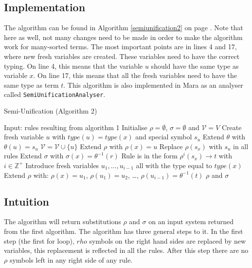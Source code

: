 \subsection{Implementation}
The algorithm can be found in Algorithm \ref{semiunification2} on page \pageref{semiunification2}. Note that here as well, not many changes need to be made in order to make the algorithm work for many-sorted terms. The most important points are in lines 4 and 17, where new fresh variables are created. These variables need to have the correct typing. On line 4, this means that the variable $u$ should have the same type as variable $x$. On line 17, this means that all the fresh variables need to have the same type as term $t$. This algorithm is also implemented in Mara as an analyser called \texttt{SemiUnificationAnalyser}.

\begin{algorithm}
\caption{Semi-Unification (Algorithm 2)}
\label{semiunification2}
\begin{algorithmic}[1]
\STATE Input: rules resulting from algorithm 1
\STATE Initialise $\rho = \emptyset$, $\sigma = \emptyset$ and $\mathcal{V} = V$
  \STATE Create fresh variable $u$ with $\textit{type}(u) = \textit{type}(x)$ and special symbol $s_u$
  \STATE Extend $\theta$ with $\theta(u) = s_u$
  \STATE $\mathcal{V} = \mathcal{V} \cup \{ u \}$
  \STATE Extend $\rho$ with $\rho(x) = u$
  \STATE Replace $\rho(s_x)$ with $s_u$ in all rules
\ENDFOR
{}
    \STATE Extend $\sigma$ with $\sigma(x) = \theta^{-1}(r)$
  \ENDIF
\ENDFOR
{}
  \STATE Rule is in the form $\rho^i(s_x) \rightarrow t$ with $i \in \mathbb{Z}^+$
  \STATE Introduce fresh variables $u_1, \dots, u_{i-1}$ all with the type equal to $\textit{type}(x)$
  \STATE Extend $\rho$ with: $\rho(x) = u_1$, $\rho(u_1) = u_2$, \dots, $\rho(u_{i-1}) = \theta^{-1}(t)$
\ENDFOR
\RETURN $\rho$ and $\sigma$
\end{algorithmic}
\end{algorithm}
\subsection{Intuition}
The algorithm will return substitutions $\rho$ and $\sigma$ on an input system returned from the first algorithm. The algorithm has three general steps to it. In the first step (the first for loop), $rho$ symbols on the right hand sides are replaced by new variables, this replacement is reflected in all the rules. After this step there are no $\rho$ symbols left in any right side of any rule.  

